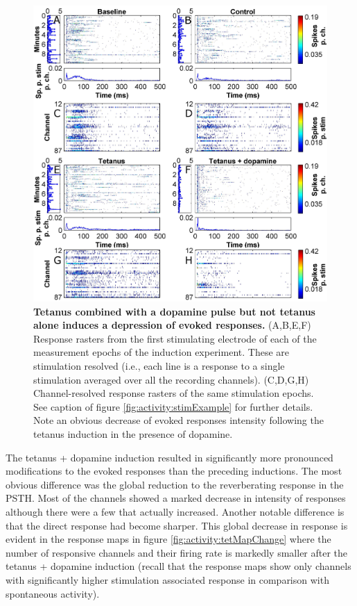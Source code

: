         \begin{figure}[!htb]
            \centering
            \includegraphics[width=15cm]{chapter3/figures/tetStimChange/tetStimChange.jpg}

            \caption[Example response rasters from the combined dopamine and tetanus plasticity induction experiment]{\textbf{Tetanus combined with a dopamine pulse but not tetanus alone induces a depression of evoked responses.} (A,B,E,F) Response rasters from the first stimulating electrode of each of the measurement epochs of the induction experiment. These are stimulation resolved (i.e., each line is a response to a single stimulation averaged over all the recording channels). (C,D,G,H) Channel-resolved response rasters of the same stimulation epochs. See caption of figure \ref{fig:activity:stimExample} for further details. Note an obvious decrease of evoked responses intensity following the tetanus induction in the presence of dopamine.}
            \label{fig:activity:tetStimChange}
        \end{figure}

    The tetanus + dopamine induction resulted in significantly more pronounced modifications to the evoked responses than the preceding inductions. The most obvious difference was the global reduction to the reverberating response in the PSTH. Most of the channels showed a marked decrease in intensity of responses although there were a few that actually increased. Another notable difference is that the direct response had become sharper. This global decrease in response is evident in the response maps in figure \ref{fig:activity:tetMapChange} where the number of responsive channels and their firing rate is markedly smaller after the tetanus + dopamine induction (recall that the response maps show only channels with significantly higher stimulation associated response in comparison with spontaneous activity).

